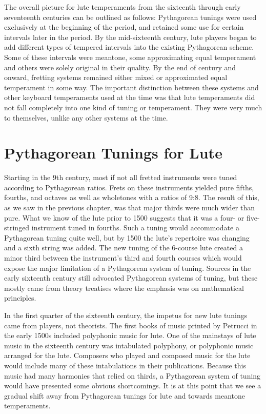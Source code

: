 The overall picture for lute temperaments from the sixteenth through early seventeenth
centuries can be outlined as follows: Pythagorean tunings were used exclusively at the
beginning of the period, and retained some use for certain intervals later in the period.
By the mid-sixteenth century, lute players began to add different types of tempered
intervals into the existing Pythagorean scheme.  Some of these intervals were meantone,
some approximating equal temperament and others were solely original in their quality.  By
the end of century and onward, fretting systems remained either mixed or approximated
equal temperament in some way. The important distinction between these systems and other
keyboard temperaments used at the time was that lute temperaments did not fall completely
into one kind of tuning or temperament. They were very much to themselves, unlike any
other systems at the time.

\section{Pythagorean Tunings for Lute}

Starting in the 9th century, most if not all fretted instruments were tuned according to
Pythagorean ratios.  Frets on these instruments yielded pure fifths, fourths, and octaves
as well as wholetones with a ratios of 9:8. \autocite[9]{ML:1} The result of this, as we
saw in the previous chapter, was that major thirds were much wider than pure.  What we
know of the lute prior to 1500 suggests that it was a four- or five-stringed instrument
tuned in fourths.  Such a tuning would accommodate a Pythagorean tuning quite well, but by
1500 the lute's repertoire was changing and a sixth string was added.  The new tuning of
the 6-course lute created a minor third between the instrument's third and fourth courses
which would expose the major limitation of a Pythagorean system of tuning. Sources in the
early sixteenth century still advocated Pythagorean systems of tuning, but these mostly
came from theory treatises where the emphasis was on mathematical principles.

In the first quarter of the sixteenth century, the impetus for new lute tunings came from
players, not theorists.  The first books of music printed by Petrucci in the early 1500s
included polyphonic music for lute.  One of the mainstays of lute music in the sixteenth
century was intabulated polyphony, or polyphonic music arranged for the lute.  Composers
who played and composed music for the lute would include many of these intabulations in
their publications. Because this music had many harmonies that relied on thirds, a
Pythagorean system of tuning would have presented some obvious shortcomings.  It is at
this point that we see a gradual shift away from Pythagorean tunings for lute and towards
meantone temperaments.

